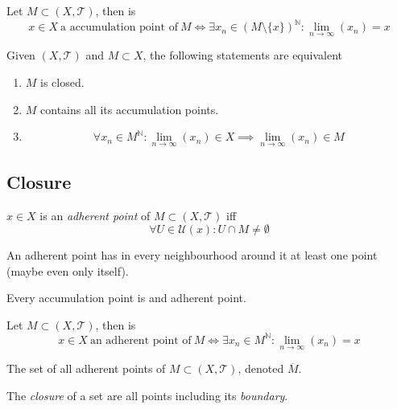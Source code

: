 \begin{proposition}
   Let \(M \subset (X, \mathcal{T})\), then is
   \[x \in X~\text{a accumulation point of}~M \iff \exists x_n \in (M\setminus\{x\})^\mathbb{N}: \lim_{n \to \infty}(x_n) = x\]
\end{proposition}

\begin{theorem}
   Given \((X, \mathcal{T})\) and \(M \subset X\), the following statements are equivalent
   \begin{enumerate}[label=\roman*, align=Center]
      \item \(M\) is closed.
      \item \(M\) contains all its accumulation points.
      \item \[\forall x_n \in M^\mathbb{N}: \lim_{n \to \infty}(x_n) \in X \implies \lim_{n \to \infty}(x_n) \in M\]
   \end{enumerate}
\end{theorem}

\subsection{Closure}
\begin{definition}
   \(x \in X\) is an \emph{adherent point} of \(M \subset (X, \mathcal{T})\) iff
   \[\forall U \in \mathcal{U}(x): U \cap M \neq \emptyset\]
\end{definition}
\begin{remark}[Intuition]
   An adherent point has in every neighbourhood around it at least one point (maybe even only itself).
\end{remark}
\begin{remark}
   Every accumulation point is and adherent point.
\end{remark}

\begin{proposition}
   Let \(M \subset (X, \mathcal{T})\), then is
   \[x \in X~\text{an adherent point of}~M \iff \exists x_n \in M^\mathbb{N}: \lim_{n \to \infty}(x_n) = x\]
\end{proposition}

\begin{definition}
   The set of all adherent points of \(M \subset (X, \mathcal{T})\), denoted \(\overline{M}\).
\end{definition}
\begin{remark}[Intuition]
   The \emph{closure} of a set are all points including its \emph{boundary}.
\end{remark}

